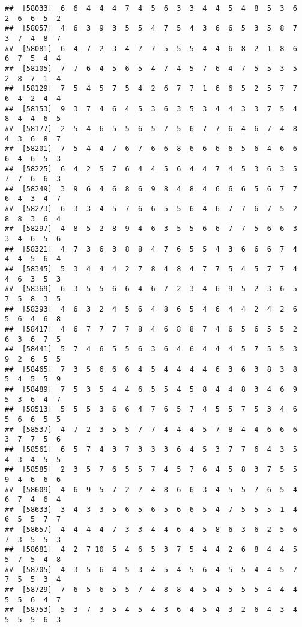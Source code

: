 \documentclass[
]{book}
\begin{document}
\begin{verbatim}
##  [58033]  6  6  4  4  4  7  4  5  6  3  3  4  4  5  4  8  5  3  6  2  6  6  5  2
##  [58057]  4  6  3  9  3  5  5  4  7  5  4  3  6  6  5  3  5  8  7  3  7  4  8  7
##  [58081]  6  4  7  2  3  4  7  7  5  5  5  4  4  6  8  2  1  8  6  6  7  5  4  4
##  [58105]  7  7  6  4  5  6  5  4  7  4  5  7  6  4  7  5  5  3  5  2  8  7  1  4
##  [58129]  7  5  4  5  7  5  4  2  6  7  7  1  6  6  5  2  5  7  7  6  4  2  4  4
##  [58153]  9  3  7  4  6  4  5  3  6  3  5  3  4  4  3  3  7  5  4  8  4  4  6  5
##  [58177]  2  5  4  6  5  5  6  5  7  5  6  7  7  6  4  6  7  4  8  4  3  6  8  7
##  [58201]  7  5  4  4  7  6  7  6  6  8  6  6  6  6  5  6  4  6  6  6  4  6  5  3
##  [58225]  6  4  2  5  7  6  4  4  5  6  4  4  7  4  5  3  6  3  5  7  7  6  6  3
##  [58249]  3  9  6  4  6  8  6  9  8  4  8  4  6  6  6  5  6  7  7  6  4  3  4  7
##  [58273]  6  3  3  4  5  7  6  6  5  5  6  4  6  7  7  6  7  5  2  8  8  3  6  4
##  [58297]  4  8  5  2  8  9  4  6  3  5  5  6  6  7  7  5  6  6  3  3  4  6  5  6
##  [58321]  4  7  3  6  3  8  8  4  7  6  5  5  4  3  6  6  6  7  4  4  4  5  6  4
##  [58345]  5  3  4  4  4  2  7  8  4  8  4  7  7  5  4  5  7  7  4  4  6  3  5  3
##  [58369]  6  3  5  5  6  6  4  6  7  2  3  4  6  9  5  2  3  6  5  7  5  8  3  5
##  [58393]  4  6  3  2  4  5  6  4  8  6  5  4  6  4  4  2  4  2  6  5  6  4  6  8
##  [58417]  4  6  7  7  7  7  8  4  6  8  8  7  4  6  5  6  5  5  2  6  3  6  7  5
##  [58441]  5  7  4  6  5  5  6  3  6  4  6  4  4  4  5  7  5  5  3  9  2  6  5  5
##  [58465]  7  3  5  6  6  6  4  5  4  4  4  4  6  3  6  3  8  3  8  5  4  5  5  9
##  [58489]  7  5  3  5  4  4  6  5  5  4  5  8  4  4  8  3  4  6  9  5  3  6  4  7
##  [58513]  5  5  5  3  6  6  4  7  6  5  7  4  5  5  7  5  3  4  6  5  6  6  5  5
##  [58537]  4  7  2  3  5  5  7  7  4  4  4  5  7  8  4  4  6  6  6  3  7  7  5  6
##  [58561]  6  5  7  4  3  7  3  3  3  6  4  5  3  7  7  6  4  3  5  4  3  4  5  5
##  [58585]  2  3  5  7  6  5  5  7  4  5  7  6  4  5  8  3  7  5  5  9  4  6  6  6
##  [58609]  4  6  9  5  7  2  7  4  8  6  6  3  4  5  5  7  6  5  4  6  7  4  6  4
##  [58633]  3  4  3  3  5  6  5  6  5  6  6  5  4  7  5  5  5  1  4  6  5  5  7  7
##  [58657]  4  4  4  4  7  3  3  4  4  6  4  5  8  6  3  6  2  5  6  7  3  5  5  3
##  [58681]  4  2  7 10  5  4  6  5  3  7  5  4  4  2  6  8  4  4  5  5  7  5  4  8
##  [58705]  4  3  5  6  4  5  3  4  5  4  5  6  4  5  5  4  4  5  7  7  5  5  3  4
##  [58729]  7  6  5  6  5  5  7  4  8  8  4  5  4  5  5  5  4  4  4  5  5  6  4  7
##  [58753]  5  3  7  3  5  4  5  4  3  6  4  5  4  3  2  6  4  3  4  5  5  5  6  3

\end{verbatim}
\end{document}

